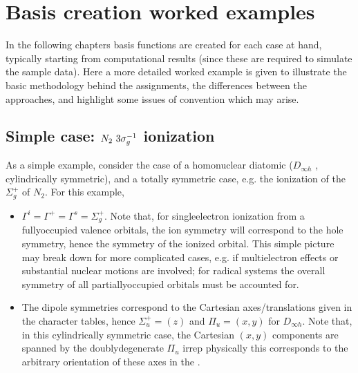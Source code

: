 \documentclass[letterpaper,table,10pt,english]{jupyterBook}
\begin{document}
\section{Basis creation worked examples}
\label{\detokenize{part2/sym-fitting-intro_220423:basis-creation-worked-examples}}
\sphinxAtStartPar
In the following chapters basis functions are created for each case at hand, typically starting from  computational results (since these are required to simulate the sample data). Here a more detailed worked example is given to illustrate the basic methodology behind the assignments, the differences between the approaches, and highlight some issues of convention which may arise.


\subsection{Simple case: \protect\(N_2~3\sigma_g^{-1}\protect\) ionization}
\label{\detokenize{part2/sym-fitting-intro_220423:simple-case-n-2-3-sigma-g-1-ionization}}
\sphinxAtStartPar
As a simple example, consider the case of a homonuclear diatomic (\(D_{\infty h}\) {\hyperref[\detokenize{backmatter/glossary:term-PG}]{}}, cylindrically symmetric), and a totally symmetric case, e.g. the ionization of the \(\Sigma_{g}^{+}\) {\hyperref[\detokenize{backmatter/glossary:term-HOMO}]{}} of \(N_2\). For this example,
\begin{itemize}
\item {} 
\sphinxAtStartPar
\(\Gamma^{i} = \Gamma^{+} = \Gamma^{s} = \Sigma_{g}^{+}\). Note that, for single\sphinxhyphen{}electron ionization from a fully\sphinxhyphen{}occupied valence orbitals, the ion symmetry will correspond to the hole symmetry, hence the symmetry of the ionized orbital. This simple picture may break down for more complicated cases, e.g. if multi\sphinxhyphen{}electron effects or substantial nuclear motions are involved; for radical systems the overall symmetry of all partially\sphinxhyphen{}occupied orbitals must be accounted for.

\item {} 
\sphinxAtStartPar
The dipole symmetries correspond to the Cartesian axes/translations given in the character tables, hence \(\Sigma_{u}^{+} = (z)\) and \(\Pi_{u} = (x,y)\) for \(D_{\infty h}\). Note that, in this cylindrically symmetric case, the Cartesian \((x,y)\) components are spanned by the doubly\sphinxhyphen{}degenerate \(\Pi_{u}\) irrep \sphinxhyphen{} physically this corresponds to the arbitrary orientation of these axes in the {\hyperref[\detokenize{backmatter/glossary:term-MF}]{}}.

\end{itemize}
\end{document}
